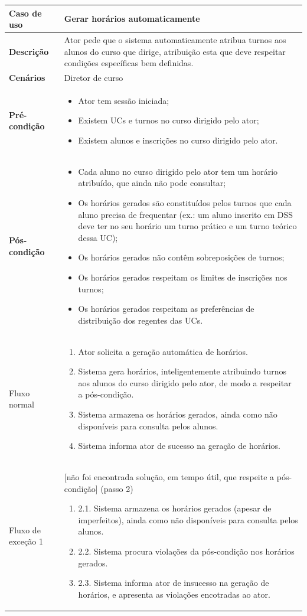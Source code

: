 \documentclass[12pt, a4paper]{article}
\newenvironment{condition}{
    \begin{itemize}[wide=0pt]
        \vspace{-0.2cm}
}{
        \vspace{-0.5cm}
    \end{itemize}
}
\newcommand\flow[1]{
    Fluxo normal &
    \singlespacing
    \begin{enumerate}[wide=0pt]
        #1
        \vspace{-0.3cm}
    \end{enumerate} \\ \hline
}
\newcommand\otherflow[3]{
    #1 &
    #2
    \singlespacing
    \begin{enumerate}[wide=0pt]
        #3
        \vspace{-0.3cm}
    \end{enumerate} \\ \hline
}
\newenvironment{usecase}[5]{
    \begin{table}[H]
        \centering
        \begin{tabular}{|>{\centering\arraybackslash\bf}m{3cm}|m{13cm}|}
            \hline
            Caso de uso & \textbf{#1} \\

            \hline
            Descrição & #2 \\

            \hline
            Cenários & #3 \\

            \hline
            Pré-condição &
            \begin{condition}
                #4
            \end{condition} \\

            \hline
            Pós-condição &
            \begin{condition}
                #5
            \end{condition} \\

            \hline
}{
    \end{tabular}
\end{table}
}
\begin{document}
\begin{usecase}
    {Gerar horários automaticamente}
    {
        Ator pede que o sistema automaticamente atribua turnos aos alunos do curso que dirige,
        atribuição esta que deve respeitar condições específicas bem definidas.
    }
    {Diretor de curso}
    {
        \item Ator tem sessão iniciada;
        \item Existem UCs e turnos no curso dirigido pelo ator;
        \item Existem alunos e inscrições no curso dirigido pelo ator.
    }
    {
        \item Cada aluno no curso dirigido pelo ator tem um horário atribuído, que ainda não pode
            consultar;
        \item Os horários gerados são constituídos pelos turnos que cada aluno precisa de frequentar
            (ex.: um aluno inscrito em DSS deve ter no seu horário um turno prático e um turno
             teórico dessa UC);
        \item Os horários gerados não contêm sobreposições de turnos;
        \item Os horários gerados respeitam os limites de inscrições nos turnos;
        \item Os horários gerados respeitam as preferências de distribuição dos regentes das UCs.
    }

    \flow{
        \item Ator solicita a geração automática de horários.
        \item Sistema gera horários, inteligentemente atribuindo turnos aos alunos do curso
            dirigido pelo ator, de modo a respeitar a pós-condição.
        \item Sistema armazena os horários gerados, ainda como não disponíveis para consulta pelos
            alunos.
        \item Sistema informa ator de sucesso na geração de horários.
    }

    \otherflow{Fluxo de exceção 1}
        {[não foi encontrada solução, em tempo útil, que respeite a pós-condição] (passo 2)}{

        \item[2.1.] Sistema armazena os horários gerados (apesar de imperfeitos), ainda como não
            disponíveis para consulta pelos alunos.
        \item[2.2.] Sistema procura violações da pós-condição nos horários gerados.
        \item[2.3.] Sistema informa ator de insucesso na geração de horários, e apresenta as
            violações encotradas ao ator.
    }
\end{usecase}
\end{document}
